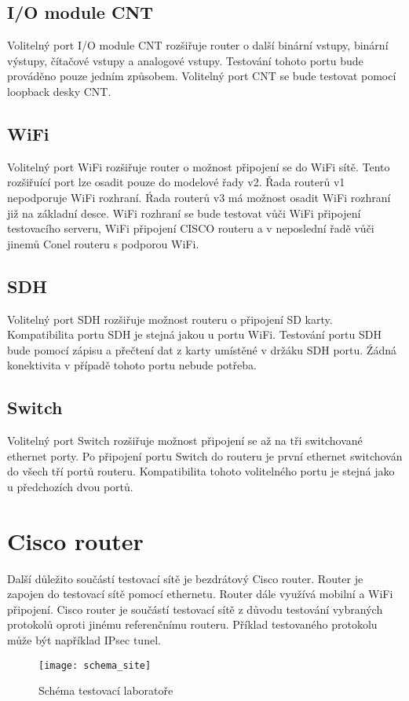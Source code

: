 \subsection{I/O module CNT}
Volitelný port I/O module CNT rozšiřuje router o další binární vstupy, binární výstupy, čítačové vstupy a analogové vstupy. Testování tohoto portu bude prováděno pouze jedním způsobem. Volitelný port CNT se bude testovat pomocí loopback desky CNT.

\subsection{WiFi}
Volitelný port WiFi rozšiřuje router o možnost připojení se do WiFi sítě. Tento rozšiřuící port lze osadit pouze do modelové řady v2. Řada routerů v1 nepodporuje WiFi rozhraní. Ŕada routerů v3 má možnost osadit WiFi rozhraní již na základní desce. WiFi rozhraní se bude testovat vůči WiFi připojení testovacího serveru, WiFi připojení CISCO routeru a v neposlední řadě vůči jinemů Conel routeru s podporou WiFi.

\subsection{SDH}
Volitelný port SDH rozšiřuje možnost routeru o připojení SD karty. Kompatibilita portu SDH je stejná jakou u portu WiFi. Testování portu SDH bude pomocí zápisu a přečtení dat z karty umístěné v držáku SDH portu. Źádná konektivita v případě tohoto portu nebude potřeba.

\subsection{Switch}
Volitelný port Switch rozšiřuje možnost připojení se až na tři switchované ethernet porty. Po připojení portu Switch do routeru je první ethernet switchován do všech tří portů routeru. Kompatibilita tohoto volitelného portu je stejná jako u předchozích dvou portů.

\section{Cisco router}
Další důležito součástí testovací sítě je bezdrátový Cisco router. Router je zapojen do testovací sítě pomocí ethernetu. Router dále využívá mobilní a WiFi připojení. Cisco router je součástí testovací sítě z důvodu testování vybraných protokolů oproti jinému referenčnímu routeru. Příklad testovaného protokolu může být například IPsec tunel.

\begin{figure}[h]
  \centering
  \texttt{[image: schema\_site]}
  \caption{Schéma testovací laboratoře}
  \label{fig:schema_site}
\end{figure}

\endinput
